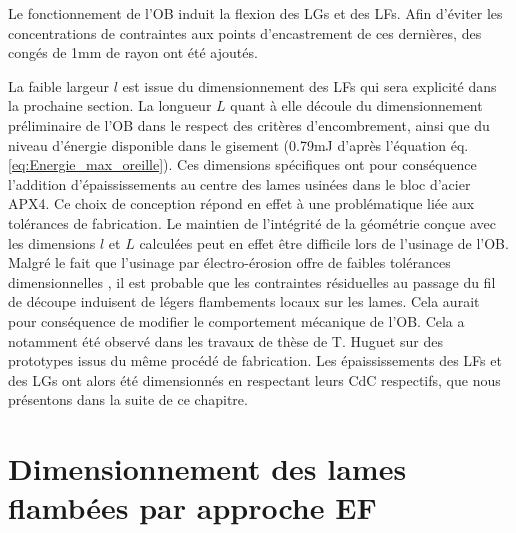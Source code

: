 Le fonctionnement de l'OB induit la flexion des LGs et des LFs. Afin d'éviter les concentrations de contraintes aux points d'encastrement de ces dernières, des congés de 1mm de rayon ont été ajoutés. 

La faible largeur $l$ est issue du dimensionnement des LFs qui sera explicité dans la prochaine section. La longueur $L$ quant à elle découle du dimensionnement préliminaire de l'OB dans le respect des critères d'encombrement, ainsi que du niveau d'énergie disponible dans le gisement (0.79mJ d'après l'équation éq. \ref{eq:Energie_max_oreille}). Ces dimensions spécifiques ont pour conséquence l'addition d'épaississements au centre des lames usinées dans le bloc d'acier APX4. Ce choix de conception répond en effet à une problématique liée aux tolérances de fabrication. Le maintien de l'intégrité de la géométrie conçue avec les dimensions $l$ et $L$ calculées peut en effet être difficile lors de l'usinage de l'OB. Malgré le fait que l'usinage par électro-érosion offre de faibles tolérances dimensionnelles \cite{Rajurkar1997}, il est probable que les contraintes résiduelles au passage du fil de découpe induisent de légers flambements locaux sur les lames. Cela aurait pour conséquence de modifier le comportement mécanique de l'OB. Cela a notamment été observé dans les travaux de thèse de T. Huguet \cite{Huguet2019} sur des prototypes issus du même procédé de fabrication. Les épaississements des LFs et des LGs ont alors été dimensionnés en respectant leurs CdC respectifs, que nous présentons dans la suite de ce chapitre.
	\section{Dimensionnement des lames flambées par approche EF}
	\label{sec:3.3:Dimensionnement des lames flambees par approche en EF}
